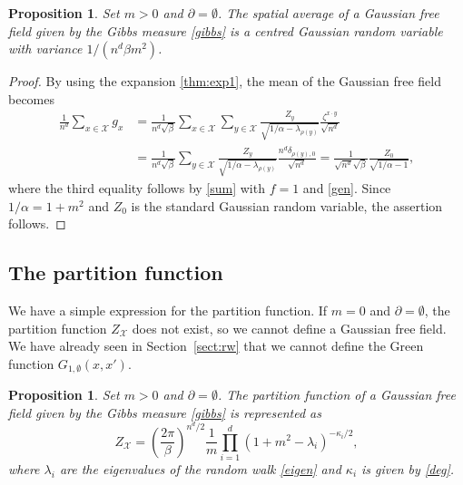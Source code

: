 \documentclass[a4paper,11pt]{article}
\theoremstyle{plain}
\newtheorem{proposition}[theorem]{Proposition}
\theoremstyle{definition}
\begin{document}
\begin{proposition}\label{pro:magnet}
  Set $m>0$ and $\partial=\emptyset$. The spatial average
  of a Gaussian free field given by the Gibbs measure
  \eqref{gibbs} is a centred Gaussian random variable with
  variance $1/(n^d\beta m^2)$.
\end{proposition}

\begin{proof}
  By using the expansion \eqref{thm:exp1}, the mean of
  the Gaussian free field becomes
  \begin{align*}
    \frac{1}{n^d}\sum_{x\in\mathcal{X}}g_x
    &=\frac{1}{n^d\sqrt{\beta}}\sum_{x\in\mathcal{X}}\sum_{y\in\mathcal{X}}
    \frac{Z_y}{\sqrt{1/\alpha-\lambda_{\rho(y)}}}
    \frac{\zeta^{x\cdot y}}{\sqrt{n^d}}\\
    &=\frac{1}{n^d\sqrt{\beta}}\sum_{y\in\mathcal{X}}
    \frac{Z_y}{\sqrt{1/\alpha-\lambda_{\rho(y)}}}
    \frac{n^d\delta_{\rho(y),0}}{\sqrt{n^d}}
    =\frac{1}{\sqrt{n^d}\sqrt{\beta}}\frac{Z_0}{\sqrt{1/\alpha-1}},
  \end{align*}             
  where the third equality follows by \eqref{sum} with
  $f=1$ and \eqref{gen}. Since $1/\alpha=1+m^2$ and $Z_0$ is
  the standard Gaussian random variable, the assertion
  follows.
\end{proof}

\subsection{The partition function}

We have a simple expression for the partition function.
If $m=0$ and $\partial=\emptyset$, the partition
function $Z_\mathcal{X}$ does not exist, so we
cannot define a Gaussian free field. We have
already seen in Section~\ref{sect:rw} that
we cannot define the Green function
$G_{1,\emptyset}(x,x')$.

\begin{proposition}\label{prop:part}
  Set $m>0$ and $\partial=\emptyset$. The partition
  function of a Gaussian free field given by
  the Gibbs measure \eqref{gibbs} is represented as
  \begin{equation}\label{prop:part:z}
    Z_\mathcal{X}=
    \left(\frac{2\pi}{\beta}\right)^{n^d/2}
    \frac{1}{m}\prod_{i=1}^d
    (1+m^2-\lambda_i)^{-\kappa_i/2},
  \end{equation}
  where $\lambda_i$ are the eigenvalues of
  the random walk \eqref{eigen} and $\kappa_i$
  is given by \eqref{deg}.
\end{proposition}
\end{document}
